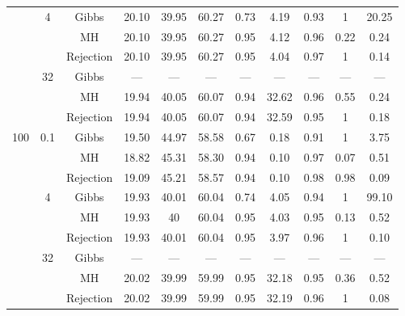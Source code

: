 \documentclass[]{gSCS2e}
\theoremstyle{plain}
\theoremstyle{definition}
\theoremstyle{remark}
\begin{document}
\begin{table}
\begin{minipage}{.90\textwidth}
{\begin{tabular}{ccccccccccc}
   & 4 & Gibbs & 20.10 & 39.95 & 60.27 & 0.73 & 4.19 & 0.93 & 1 & 20.25 \\ 
   &  & MH & 20.10 & 39.95 & 60.27 & 0.95 & 4.12 & 0.96 & 0.22 & 0.24 \\ 
   \vspace{0.2cm} &  & Rejection & 20.10 & 39.95 & 60.27 & 0.95 & 4.04 & 0.97 & 1 & 0.14 \\ 
   & 32 & Gibbs & --- & --- & --- & --- & --- & --- & --- & --- \\ 
   &  & MH & 19.94 & 40.05 & 60.07 & 0.94 & 32.62 & 0.96 & 0.55 & 0.24 \\ 
   &  & Rejection & 19.94 & 40.05 & 60.07 & 0.94 & 32.59 & 0.95 & 1 & 0.18 \\ 
   \cmidrule{1-11} 
 100 & 0.1 & Gibbs & 19.50 & 44.97 & 58.58 & 0.67 & 0.18 & 0.91 & 1 & 3.75 \\ 
   &  & MH & 18.82 & 45.31 & 58.30 & 0.94 & 0.10 & 0.97 & 0.07 & 0.51 \\ 
   \vspace{0.2cm} &  & Rejection & 19.09 & 45.21 & 58.57 & 0.94 & 0.10 & 0.98 & 0.98 & 0.09 \\ 
   & 4 & Gibbs & 19.93 & 40.01 & 60.04 & 0.74 & 4.05 & 0.94 & 1 & 99.10 \\ 
   &  & MH & 19.93 & 40 & 60.04 & 0.95 & 4.03 & 0.95 & 0.13 & 0.52 \\ 
   \vspace{0.2cm} &  & Rejection & 19.93 & 40.01 & 60.04 & 0.95 & 3.97 & 0.96 & 1 & 0.10 \\ 
   & 32 & Gibbs & --- & --- & --- & --- & --- & --- & --- & --- \\ 
   &  & MH & 20.02 & 39.99 & 59.99 & 0.95 & 32.18 & 0.95 & 0.36 & 0.52 \\ 
   &  & Rejection & 20.02 & 39.99 & 59.99 & 0.95 & 32.19 & 0.96 & 1 & 0.08 \\ 
   \bottomrule 
\end{tabular}
}



\vspace{-0.3cm}
\end{minipage}
\end{table}
\end{document}
